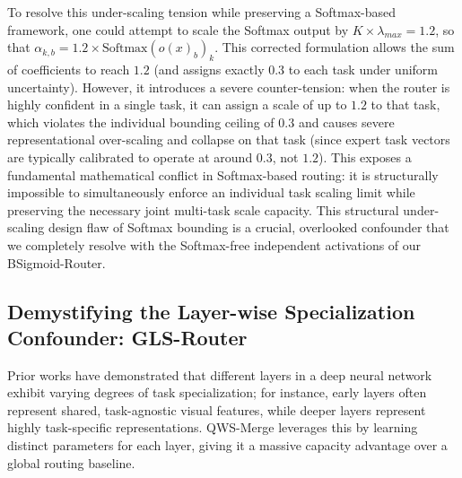 To resolve this under-scaling tension while preserving a Softmax-based framework, one could attempt to scale the Softmax output by $K \times \lambda_{max} = 1.2$, so that $\alpha_{k, b} = 1.2 \times \text{Softmax}(o(x)_b)_k$. This corrected formulation allows the sum of coefficients to reach $1.2$ (and assigns exactly $0.3$ to each task under uniform uncertainty). However, it introduces a severe counter-tension: when the router is highly confident in a single task, it can assign a scale of up to $1.2$ to that task, which violates the individual bounding ceiling of $0.3$ and causes severe representational over-scaling and collapse on that task (since expert task vectors are typically calibrated to operate at around $0.3$, not $1.2$). This exposes a fundamental mathematical conflict in Softmax-based routing: it is structurally impossible to simultaneously enforce an individual task scaling limit while preserving the necessary joint multi-task scale capacity. This structural under-scaling design flaw of Softmax bounding is a crucial, overlooked confounder that we completely resolve with the Softmax-free independent activations of our BSigmoid-Router.

\subsection{Demystifying the Layer-wise Specialization Confounder: GLS-Router}
Prior works have demonstrated that different layers in a deep neural network exhibit varying degrees of task specialization; for instance, early layers often represent shared, task-agnostic visual features, while deeper layers represent highly task-specific representations. QWS-Merge leverages this by learning distinct parameters for each layer, giving it a massive capacity advantage over a global routing baseline.

